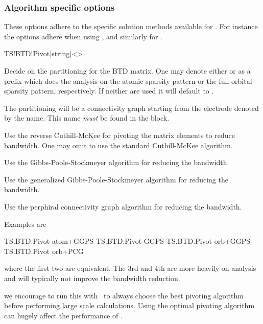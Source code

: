 \subsubsection{Algorithm specific options}

These options adhere to the specific solution methods available for
\tsiesta. For instance the  options adhere when using
, and similarly for .

\begin{fdfentry}{TS!BTD!Pivot}[string]<>

  Decide on the partitioning for the BTD matrix. One may denote either
   or  as a prefix which does the analysis on
  the atomic sparsity pattern or the full orbital sparsity pattern,
  respectively. If neither are used it will default to .

  \begin{fdfoptions}

    The partitioning will be a connectivity graph starting from the
    electrode denoted by the name. This name \emph{must} be found in
    the  block. 

    \option[rev-CM] %
    Use the reverse Cuthill-McKee for pivoting the matrix elements to
    reduce bandwidth. One may omit  to use the standard
    Cuthill-McKee algorithm.

    \option[GPS] %
    Use the Gibbs-Poole-Stockmeyer algorithm for reducing the
    bandwidth.

    \option[GGPS] %
    Use the generalized Gibbs-Poole-Stockmeyer algorithm for reducing
    the bandwidth.

    \option[PCG] %
    Use the perphiral connectivity graph algorithm for reducing the
    bandwidth.

  \end{fdfoptions}

  Examples are
  \begin{fdfexample}
    TS.BTD.Pivot atom+GGPS
    TS.BTD.Pivot GGPS
    TS.BTD.Pivot orb+GGPS
    TS.BTD.Pivot orb+PCG
  \end{fdfexample}
  where the first two are equivalent. The 3rd and 4th are more heavily
  on analysis and will typically not improve the bandwidth reduction.

  \note we encourage to run this with \fdftrue\ to always choose the
  best pivoting algorithm before performing large scale
  calculations. Using the optimal pivoting algorithm can hugely affect
  the performance of \tsiesta.
  
\end{fdfentry}

